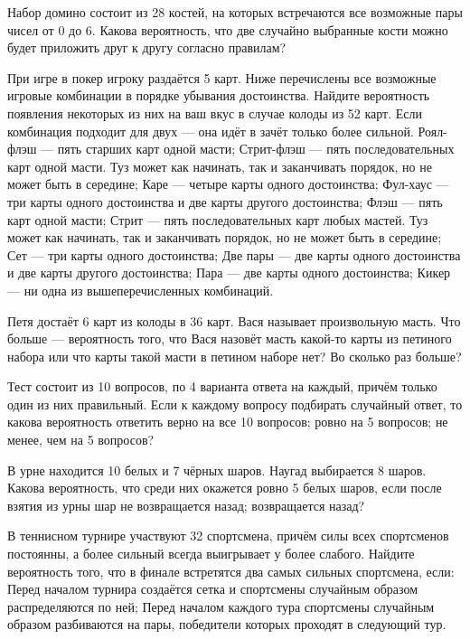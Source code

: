 \documentclass[a4paper,12pt]{article}
\begin{document}
  Набор домино состоит из 28 костей, на которых встречаются все возможные пары чисел от 0 до 6. Какова вероятность, что две случайно выбранные кости можно будет приложить друг к другу согласно правилам?

\vfill
{}
\newpage

  При игре в покер игроку раздаётся 5 карт. Ниже перечислены все возможные игровые комбинации в порядке убывания достоинства. Найдите вероятность появления некоторых из них на ваш вкус в случае колоды из 52 карт. Если комбинация подходит для двух --- она идёт в зачёт только более сильной.
     Роял-флэш --- пять старших карт одной масти;
     Стрит-флэш --- пять последовательных карт одной масти. Туз может как начинать, так и заканчивать порядок, но не может быть в середине;
     Каре --- четыре карты одного достоинства;
     Фул-хаус --- три карты одного достоинства и две карты другого достоинства;
     Флэш --- пять карт одной масти;
     Стрит --- пять последовательных карт любых мастей. Туз может как начинать, так и заканчивать порядок, но не может быть в середине;
     Сет --- три карты одного достоинства;
     Две пары --- две карты одного достоинства и две карты другого достоинства;
     Пара --- две карты одного достоинства;
     Кикер --- ни одна из вышеперечисленных комбинаций.

  Петя достаёт 6 карт из колоды в 36 карт. Вася называет произвольную масть. Что больше --- вероятность того, что Вася назовёт масть какой-то карты из петиного набора или что карты такой масти в петином наборе нет? Во сколько раз больше?

  Тест состоит из 10 вопросов, по 4 варианта ответа на каждый, причём только один из них правильный. Если к каждому вопросу подбирать случайный ответ, то какова вероятность ответить верно  на все 10 вопросов;  ровно на 5 вопросов;  не менее, чем на 5 вопросов?

  В урне находится 10 белых и 7 чёрных шаров. Наугад выбирается 8 шаров. Какова вероятность, что среди них окажется ровно 5 белых шаров, если после взятия из урны шар  не возвращается назад;  возвращается назад?

  В теннисном турнире участвуют 32 спортсмена, причём силы всех спортсменов постоянны, а более сильный всегда выигрывает у более слабого. Найдите вероятность того, что в финале встретятся два самых сильных спортсмена, если:
     Перед началом турнира создаётся сетка и спортсмены случайным образом распределяются по ней;
     Перед началом каждого тура спортсмены случайным образом разбиваются на пары, победители которых проходят в следующий тур.
\end{document}
